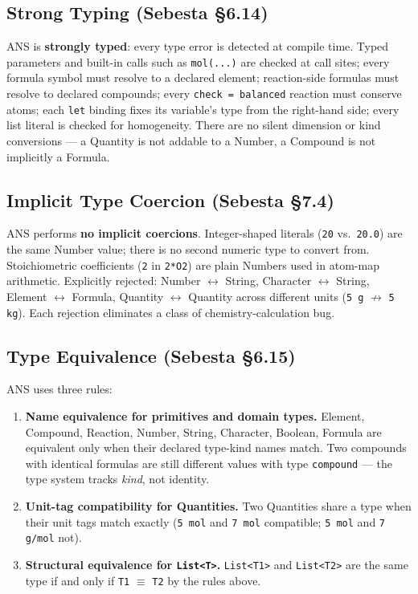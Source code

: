 \documentclass[11pt,a4paper]{article}
\newcommand{\code}[1]{\texttt{#1}}
\begin{document}
\subsection{Strong Typing (Sebesta \S6.14)}

ANS is \textbf{strongly typed}: every type error is detected at compile time. Typed parameters and built-in calls such as \code{mol(...)} are checked at call sites; every formula symbol must resolve to a declared element; reaction-side formulas must resolve to declared compounds; every \code{check = balanced} reaction must conserve atoms; each \code{let} binding fixes its variable's type from the right-hand side; every list literal is checked for homogeneity. There are no silent dimension or kind conversions --- a Quantity is not addable to a Number, a Compound is not implicitly a Formula.

\subsection{Implicit Type Coercion (Sebesta \S7.4)}

ANS performs \textbf{no implicit coercions}. Integer-shaped literals (\code{20} vs.\ \code{20.0}) are the same Number value; there is no second numeric type to convert from. Stoichiometric coefficients (\code{2} in \code{2*O2}) are plain Numbers used in atom-map arithmetic. Explicitly rejected: Number $\leftrightarrow$ String, Character $\leftrightarrow$ String, Element $\leftrightarrow$ Formula, Quantity $\leftrightarrow$ Quantity across different units (\code{5 g} $\not\to$ \code{5 kg}). Each rejection eliminates a class of chemistry-calculation bug.

\subsection{Type Equivalence (Sebesta \S6.15)}

ANS uses three rules:
\begin{enumerate}[leftmargin=1.5em,itemsep=2pt]
\item \textbf{Name equivalence for primitives and domain types.} Element, Compound, Reaction, Number, String, Character, Boolean, Formula are equivalent only when their declared type-kind names match. Two compounds with identical formulas are still different values with type \code{compound} --- the type system tracks \emph{kind}, not identity.
\item \textbf{Unit-tag compatibility for Quantities.} Two Quantities share a type when their unit tags match exactly (\code{5 mol} and \code{7 mol} compatible; \code{5 mol} and \code{7 g/mol} not).
\item \textbf{Structural equivalence for \code{List<T>}.} \code{List<T1>} and \code{List<T2>} are the same type if and only if \code{T1} $\equiv$ \code{T2} by the rules above.
\end{enumerate}
\end{document}
